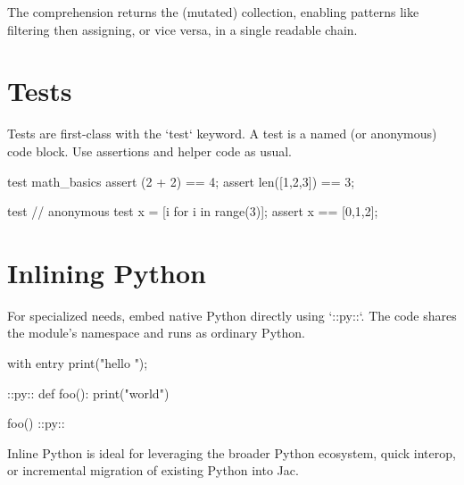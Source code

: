The comprehension returns the (mutated) collection, enabling patterns like filtering then assigning, or vice versa, in a single readable chain.

\section{Tests}

Tests are first-class with the `test` keyword. A test is a named (or anonymous) code block. Use assertions and helper code as usual.

\begin{jacblock}
test math_basics {
    assert (2 + 2) == 4;
    assert len([1,2,3]) == 3;
}

test {  // anonymous test
    x = [i for i in range(3)];
    assert x == [0,1,2];
}
\end{jacblock}

\section{Inlining Python}

For specialized needs, embed native Python directly using `::py::`. The code shares the module's namespace and runs as ordinary Python.

\begin{jacblock}
with entry {
    print("hello ");
}

::py::
def foo():
    print("world")

foo()
::py::
\end{jacblock}

Inline Python is ideal for leveraging the broader Python ecosystem, quick interop, or incremental migration of existing Python into Jac.